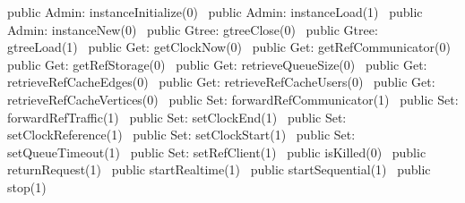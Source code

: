 public \LA{}Admin: instanceInitialize(0)~{\nwtagstyle{}}\RA{}
public \LA{}Admin: instanceLoad(1)~{\nwtagstyle{}}\RA{}
public \LA{}Admin: instanceNew(0)~{\nwtagstyle{}}\RA{}
public \LA{}Gtree: gtreeClose(0)~{\nwtagstyle{}}\RA{}
public \LA{}Gtree: gtreeLoad(1)~{\nwtagstyle{}}\RA{}
public \LA{}Get: getClockNow(0)~{\nwtagstyle{}}\RA{}
public \LA{}Get: getRefCommunicator(0)~{\nwtagstyle{}}\RA{}
public \LA{}Get: getRefStorage(0)~{\nwtagstyle{}}\RA{}
public \LA{}Get: retrieveQueueSize(0)~{\nwtagstyle{}}\RA{}
public \LA{}Get: retrieveRefCacheEdges(0)~{\nwtagstyle{}}\RA{}
public \LA{}Get: retrieveRefCacheUsers(0)~{\nwtagstyle{}}\RA{}
public \LA{}Get: retrieveRefCacheVertices(0)~{\nwtagstyle{}}\RA{}
public \LA{}Set: forwardRefCommunicator(1)~{\nwtagstyle{}}\RA{}
public \LA{}Set: forwardRefTraffic(1)~{\nwtagstyle{}}\RA{}
public \LA{}Set: setClockEnd(1)~{\nwtagstyle{}}\RA{}
public \LA{}Set: setClockReference(1)~{\nwtagstyle{}}\RA{}
public \LA{}Set: setClockStart(1)~{\nwtagstyle{}}\RA{}
public \LA{}Set: setQueueTimeout(1)~{\nwtagstyle{}}\RA{}
public \LA{}Set: setRefClient(1)~{\nwtagstyle{}}\RA{}
public \LA{}isKilled(0)~{\nwtagstyle{}}\RA{}
public \LA{}returnRequest(1)~{\nwtagstyle{}}\RA{}
public \LA{}startRealtime(1)~{\nwtagstyle{}}\RA{}
public \LA{}startSequential(1)~{\nwtagstyle{}}\RA{}
public \LA{}stop(1)~{\nwtagstyle{}}\RA{}
\nwendcode{}\nwdocspar

